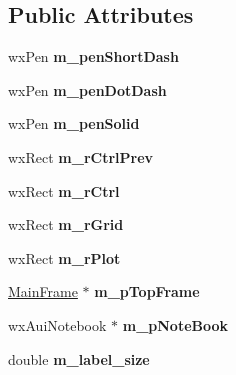 \subsection*{Public Attributes}
\begin{DoxyCompactItemize}
\item 
\hypertarget{class_plot_panel_a111adb0975870b5d448da832bd44fc99}{wx\-Pen {\bfseries m\-\_\-pen\-Short\-Dash}}\label{class_plot_panel_a111adb0975870b5d448da832bd44fc99}

\item 
\hypertarget{class_plot_panel_a227751dba1777b261ffdc27b53fb087d}{wx\-Pen {\bfseries m\-\_\-pen\-Dot\-Dash}}\label{class_plot_panel_a227751dba1777b261ffdc27b53fb087d}

\item 
\hypertarget{class_plot_panel_a229628c08bb7d0fa16589dbf83d635d1}{wx\-Pen {\bfseries m\-\_\-pen\-Solid}}\label{class_plot_panel_a229628c08bb7d0fa16589dbf83d635d1}

\item 
\hypertarget{class_plot_panel_aef7e50cc8a27b9434d17d7d8c245606c}{wx\-Rect {\bfseries m\-\_\-r\-Ctrl\-Prev}}\label{class_plot_panel_aef7e50cc8a27b9434d17d7d8c245606c}

\item 
\hypertarget{class_plot_panel_a2c10cfe6bcd979613cec037a71ba2c94}{wx\-Rect {\bfseries m\-\_\-r\-Ctrl}}\label{class_plot_panel_a2c10cfe6bcd979613cec037a71ba2c94}

\item 
\hypertarget{class_plot_panel_ae8d79eab28220ea1fa8ffcbfd70bc84a}{wx\-Rect {\bfseries m\-\_\-r\-Grid}}\label{class_plot_panel_ae8d79eab28220ea1fa8ffcbfd70bc84a}

\item 
\hypertarget{class_plot_panel_aa4d6249f2f09d03682b8fa704be04548}{wx\-Rect {\bfseries m\-\_\-r\-Plot}}\label{class_plot_panel_aa4d6249f2f09d03682b8fa704be04548}

\item 
\hypertarget{class_plot_panel_ad28637582a93843082fc7b1d8d80c807}{\hyperlink{class_main_frame}{Main\-Frame} $\ast$ {\bfseries m\-\_\-p\-Top\-Frame}}\label{class_plot_panel_ad28637582a93843082fc7b1d8d80c807}

\item 
\hypertarget{class_plot_panel_a63b99d2f75a6486dda96f4934ba369fa}{wx\-Aui\-Notebook $\ast$ {\bfseries m\-\_\-p\-Note\-Book}}\label{class_plot_panel_a63b99d2f75a6486dda96f4934ba369fa}

\item 
\hypertarget{class_plot_panel_a00eb5aef94866f0f385fcf793cb841b6}{double {\bfseries m\-\_\-label\-\_\-size}}\label{class_plot_panel_a00eb5aef94866f0f385fcf793cb841b6}


\end{DoxyCompactItemize}
